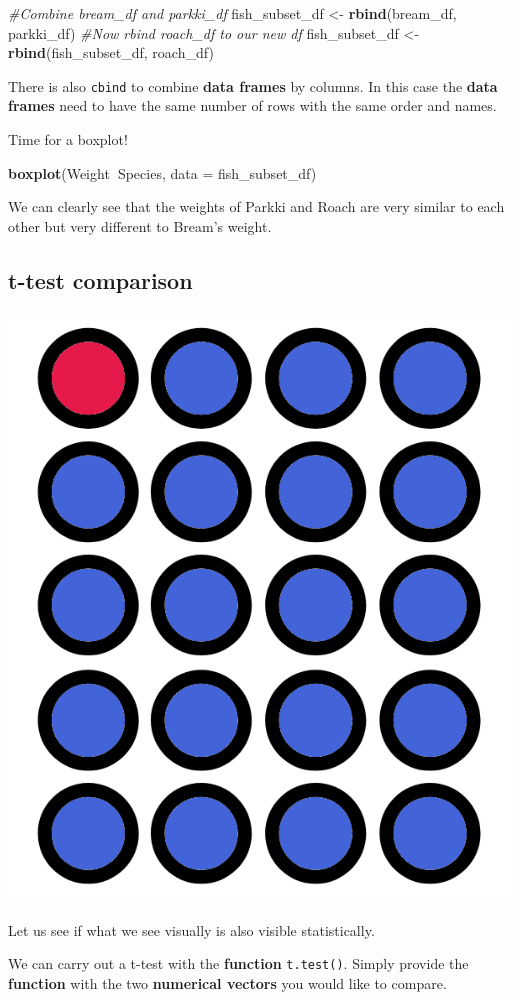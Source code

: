 \documentclass[]{book}
\newenvironment{Shaded}{\begin{snugshade}}{\end{snugshade}}
\newcommand{\KeywordTok}[1]{\textcolor[rgb]{0.13,0.29,0.53}{\textbf{#1}}}
\newcommand{\DataTypeTok}[1]{\textcolor[rgb]{0.13,0.29,0.53}{#1}}
\newcommand{\StringTok}[1]{\textcolor[rgb]{0.31,0.60,0.02}{#1}}
\newcommand{\CommentTok}[1]{\textcolor[rgb]{0.56,0.35,0.01}{\textit{#1}}}
\newcommand{\OperatorTok}[1]{\textcolor[rgb]{0.81,0.36,0.00}{\textbf{#1}}}
\newcommand{\NormalTok}[1]{#1}
\begin{document}
\begin{Shaded}
\begin{Highlighting}[]
\CommentTok{#Combine bream_df and parkki_df}
\NormalTok{fish_subset_df <-}\StringTok{ }\KeywordTok{rbind}\NormalTok{(bream_df, parkki_df)}
\CommentTok{#Now rbind roach_df to our new df}
\NormalTok{fish_subset_df <-}\StringTok{ }\KeywordTok{rbind}\NormalTok{(fish_subset_df, roach_df)}
\end{Highlighting}
\end{Shaded}

There is also \texttt{cbind} to combine \textbf{data frames} by columns.
In this case the \textbf{data frames} need to have the same number of
rows with the same order and names.

Time for a boxplot!

\begin{Shaded}
\begin{Highlighting}[]
\KeywordTok{boxplot}\NormalTok{(Weight}\OperatorTok{~}\NormalTok{Species, }\DataTypeTok{data =}\NormalTok{ fish_subset_df)}
\end{Highlighting}
\end{Shaded}

We can clearly see that the weights of Parkki and Roach are very similar
to each other but very different to Bream's weight.

\subsection{t-test comparison}\label{t-test-comparison}

\begin{center}\includegraphics[width=0.15\linewidth]{figures/five_percent} \end{center}

Let us see if what we see visually is also visible statistically.

We can carry out a t-test with the \textbf{function} \texttt{t.test()}.
Simply provide the \textbf{function} with the two \textbf{numerical
vectors} you would like to compare.

\begin{Shaded}
\end{Shaded}
\end{document}
